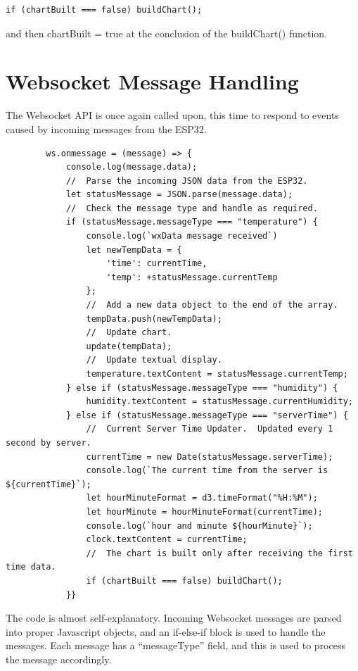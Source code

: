 \documentclass[letterpaper,]{book}
\begin{document}
\begin{verbatim}
if (chartBuilt === false) buildChart();
\end{verbatim}

and then chartBuilt = true at the conclusion of the buildChart()
function.

\section{Websocket Message Handling}\label{websocket-message-handling}

The Websocket API is once again called upon, this time to respond to
events caused by incoming messages from the ESP32.

\begin{verbatim}
        ws.onmessage = (message) => {
            console.log(message.data);
            //  Parse the incoming JSON data from the ESP32.
            let statusMessage = JSON.parse(message.data);
            //  Check the message type and handle as required.
            if (statusMessage.messageType === "temperature") {
                console.log(`wxData message received`)
                let newTempData = {
                    'time': currentTime,
                    'temp': +statusMessage.currentTemp
                };
                //  Add a new data object to the end of the array.
                tempData.push(newTempData);
                //  Update chart.
                update(tempData);
                //  Update textual display.
                temperature.textContent = statusMessage.currentTemp;
            } else if (statusMessage.messageType === "humidity") {
                humidity.textContent = statusMessage.currentHumidity;
            } else if (statusMessage.messageType === "serverTime") {
                //  Current Server Time Updater.  Updated every 1 second by server.
                currentTime = new Date(statusMessage.serverTime);
                console.log(`The current time from the server is ${currentTime}`);
                let hourMinuteFormat = d3.timeFormat("%H:%M");
                let hourMinute = hourMinuteFormat(currentTime);
                console.log(`hour and minute ${hourMinute}`);
                clock.textContent = currentTime;
                //  The chart is built only after receiving the first time data.
                if (chartBuilt === false) buildChart();
            }}
\end{verbatim}

The code is almost self-explanatory. Incoming Websocket messages are
parsed into proper Javascript objects, and an if-else-if block is used
to handle the messages. Each message has a ``messageType'' field, and
this is used to process the message accordingly.
\end{document}
